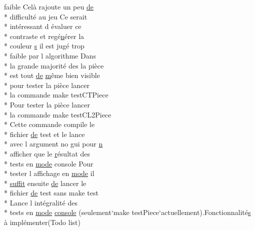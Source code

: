 \begin{DoxyCompactItemize}
$$faible Celà rajoute un peu \hyperlink{mainpage_8dox_ab37fa35e77d95c6d0d0ab620c97c3db8}{de} \\*
difficulté au jeu Ce serait \\*
intéressant d évaluer ce \\*
contraste et regé\hyperlink{glext_8h_a0788d3762d0c3c76e4c094d8078b4c27}{n}érer la \\*
couleur \hyperlink{gl_8h_ad585a1393cfa368fa9dc3d8ebff640d5}{s} il est jugé trop \\*
faible par l algorithme Dans \\*
la grande majorité des la pièce \\*
est tout \hyperlink{mainpage_8dox_ab37fa35e77d95c6d0d0ab620c97c3db8}{de} \hyperlink{glext_8h_af593500c283bf1a787a6f947f503a5c2}{m}ême bien visible \\*
pour tester la pièce lancer \\*
la commande make test\-C\-T\-Piece \\*
Pour tester la pièce lancer \\*
la commande make test\-C\-L2\-Piece \\*
Cette commande compile le \\*
fichier \hyperlink{mainpage_8dox_ab37fa35e77d95c6d0d0ab620c97c3db8}{de} test et le lance \\*
avec l argument no gui pour \hyperlink{glext_8h_a0788d3762d0c3c76e4c094d8078b4c27}{n} \\*
afficher que le \hyperlink{gl_8h_abe08814c2f72843fde4d8df41440d5a0}{r}ésultat des \\*
tests en \hyperlink{glext_8h_a1e71d9c196e4683cc06c4b54d53f7ef5}{mode} console Pour \\*
tester l affichage en \hyperlink{glext_8h_a1e71d9c196e4683cc06c4b54d53f7ef5}{mode} il \\*
\hyperlink{mainpage_8dox_a3cef46abe2a50831a9672fa7c65a1bcb}{suffit} ensuite \hyperlink{mainpage_8dox_ab37fa35e77d95c6d0d0ab620c97c3db8}{de} lancer le \\*
fichier \hyperlink{mainpage_8dox_ab37fa35e77d95c6d0d0ab620c97c3db8}{de} test sans make test \\*
Lance l intégralité des \\*
tests en \hyperlink{glext_8h_a1e71d9c196e4683cc06c4b54d53f7ef5}{mode} \hyperlink{mainpage_8dox_a4aa4ee6520a20be6bee3a5219b5d8d9b}{console} (seulement`make test\-Piece`actuellement).Fonctionnalité\hyperlink{gl_8h_ad585a1393cfa368fa9dc3d8ebff640d5}{s} à implémenter(Todo list)
\end{DoxyCompactItemize}
